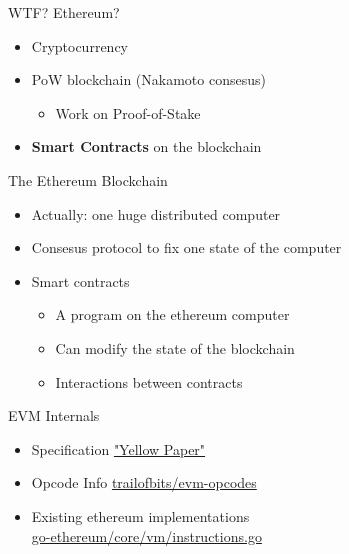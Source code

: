 
\begin{frame}
  {WTF? Ethereum?}

  \begin{itemize}
    \item Cryptocurrency
    \item PoW blockchain (Nakamoto consesus)
      \begin{itemize}
        \item Work on Proof-of-Stake
      \end{itemize}
    \item \textbf{Smart Contracts} on the blockchain
  \end{itemize}
\end{frame}

\begin{frame}
  {The Ethereum Blockchain}

  \begin{itemize}
    \item Actually: one huge distributed computer
    \item Consesus protocol to fix one state of the computer
    \item Smart contracts
      \begin{itemize}
        \item A program on the ethereum computer
        \item Can modify the state of the blockchain
        \item Interactions between contracts
      \end{itemize}
  \end{itemize}
\end{frame}

\begin{frame}
  {EVM Internals}

  \begin{itemize}
    \item Specification \href{http://gavwood.com/Paper.pdf}{"Yellow Paper"}
    \item Opcode Info
      \href{https://github.com/trailofbits/evm-opcodes}{trailofbits/evm-opcodes}
    \item Existing ethereum implementations \\
      \href{https://github.com/ethereum/go-ethereum/blob/master/core/vm/instructions.go}{go-ethereum/core/vm/instructions.go}
  \end{itemize}

\end{frame}

